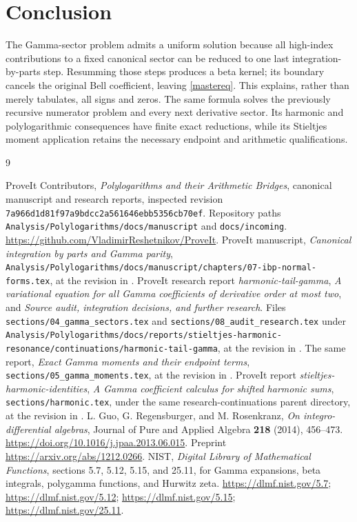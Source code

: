\documentclass[11pt]{article}
\numberwithin{equation}{section}
\theoremstyle{definition}\newtheorem{definition}[theorem]{Definition}
\theoremstyle{remark}\newtheorem{remark}[theorem]{Remark}
\newcommand{\pin}{\texttt{7a966d1d81f97a9bdcc2a561646ebb5356cb70ef}}
\begin{document}
\section*{Conclusion}
The Gamma-sector problem admits a uniform solution because all high-index contributions to a fixed canonical sector can be reduced to one last integration-by-parts step. Resumming those steps produces a beta kernel; its boundary cancels the original Bell coefficient, leaving \eqref{mastereq}. This explains, rather than merely tabulates, all signs and zeros. The same formula solves the previously recursive numerator problem and every next derivative sector. Its harmonic and polylogarithmic consequences have finite exact reductions, while its Stieltjes moment application retains the necessary endpoint and arithmetic qualifications.

\begin{thebibliography}{9}
\raggedright
{} ProveIt Contributors, \emph{Polylogarithms and their Arithmetic Bridges}, canonical manuscript and research reports, inspected revision \pin. Repository paths \nolinkurl{Analysis/Polylogarithms/docs/manuscript} and \nolinkurl{docs/incoming}. \url{https://github.com/VladimirReshetnikov/ProveIt}.
 ProveIt manuscript, \emph{Canonical integration by parts and Gamma parity}, \nolinkurl{Analysis/Polylogarithms/docs/manuscript/chapters/07-ibp-normal-forms.tex}, at the revision in \cite{repo}.
 ProveIt research report \emph{harmonic-tail-gamma}, \emph{A variational equation for all Gamma coefficients of derivative order at most two}, and \emph{Source audit, integration decisions, and further research}. Files \nolinkurl{sections/04_gamma_sectors.tex} and \nolinkurl{sections/08_audit_research.tex} under \nolinkurl{Analysis/Polylogarithms/docs/reports/stieltjes-harmonic-resonance/continuations/harmonic-tail-gamma}, at the revision in \cite{repo}.
 The same report, \emph{Exact Gamma moments and their endpoint terms}, \nolinkurl{sections/05_gamma_moments.tex}, at the revision in \cite{repo}.
 ProveIt report \emph{stieltjes-harmonic-identities}, \emph{A Gamma coefficient calculus for shifted harmonic sums}, \nolinkurl{sections/harmonic.tex}, under the same research-continuations parent directory, at the revision in \cite{repo}.
 L. Guo, G. Regensburger, and M. Rosenkranz, \emph{On integro-differential algebras}, Journal of Pure and Applied Algebra \textbf{218} (2014), 456--473. \url{https://doi.org/10.1016/j.jpaa.2013.06.015}. Preprint \url{https://arxiv.org/abs/1212.0266}.
 NIST, \emph{Digital Library of Mathematical Functions}, sections 5.7, 5.12, 5.15, and 25.11, for Gamma expansions, beta integrals, polygamma functions, and Hurwitz zeta. \url{https://dlmf.nist.gov/5.7}; \url{https://dlmf.nist.gov/5.12}; \url{https://dlmf.nist.gov/5.15}; \url{https://dlmf.nist.gov/25.11}.
\end{thebibliography}
\end{document}
